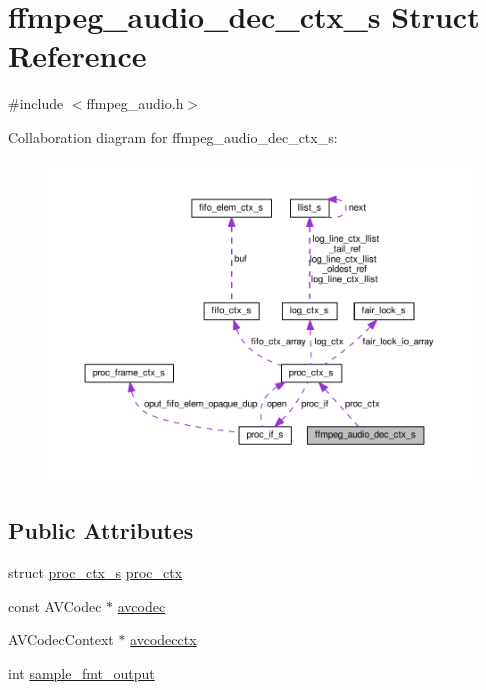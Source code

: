 \hypertarget{structffmpeg__audio__dec__ctx__s}{}\section{ffmpeg\+\_\+audio\+\_\+dec\+\_\+ctx\+\_\+s Struct Reference}
\label{structffmpeg__audio__dec__ctx__s}


{\ttfamily \#include $<$ffmpeg\+\_\+audio.\+h$>$}



Collaboration diagram for ffmpeg\+\_\+audio\+\_\+dec\+\_\+ctx\+\_\+s\+:\nopagebreak
\begin{figure}[H]
\begin{center}
\leavevmode
\includegraphics[width=350pt]{structffmpeg__audio__dec__ctx__s__coll__graph}
\end{center}
\end{figure}
\subsection*{Public Attributes}
\begin{DoxyCompactItemize}
\item 
struct \hyperlink{structproc__ctx__s}{proc\+\_\+ctx\+\_\+s} \hyperlink{structffmpeg__audio__dec__ctx__s_a7d595b487c31ee5bd9b809bfb0403c5e}{proc\+\_\+ctx}
\item 
const A\+V\+Codec $\ast$ \hyperlink{structffmpeg__audio__dec__ctx__s_a8a73d6d4be6d11d6b1748cd5de5809b1}{avcodec}
\item 
A\+V\+Codec\+Context $\ast$ \hyperlink{structffmpeg__audio__dec__ctx__s_a0eacb15c64cb86d241a420b859d12e78}{avcodecctx}
\item 
int \hyperlink{structffmpeg__audio__dec__ctx__s_a02c7c9203da4242a4e088ac6cc4c304d}{sample\+\_\+fmt\+\_\+output}
\end{DoxyCompactItemize}


